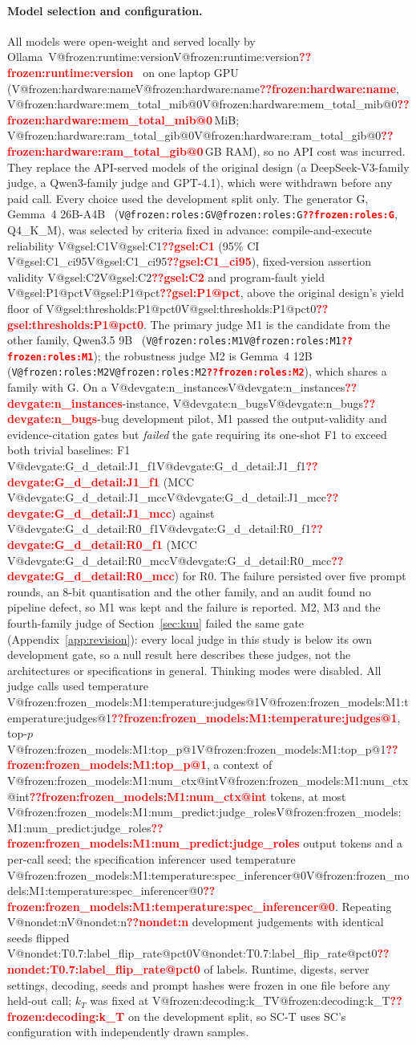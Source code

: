 \documentclass[pdflatex,iicol,sn-mathphys-num]{sn-jnl}
\makeatletter
\newcommand{\V}[1]{\ifcsname V@#1\endcsname\csname V@#1\endcsname\else\textbf{\textcolor{red}{??#1}}\fi}
\makeatother
\begin{document}
\paragraph{Model selection and configuration.} All models were open-weight and served locally by Ollama~\V{frozen:runtime:version}~\cite{ollama04013} on one laptop GPU (\V{frozen:hardware:name}, \V{frozen:hardware:mem_total_mib@0}\,MiB; \V{frozen:hardware:ram_total_gib@0}\,GB RAM), so no API cost was incurred. They replace the API-served models of the original design (a DeepSeek-V3-family judge, a Qwen3-family judge and GPT-4.1), which were withdrawn before any paid call. Every choice used the development split only. The generator G, Gemma~4 26B-A4B~\cite{gemma4} (\texttt{\V{frozen:roles:G}}, Q4\_K\_M), was selected by criteria fixed in advance: compile-and-execute reliability \V{gsel:C1} (95\% CI \V{gsel:C1_ci95}), fixed-version assertion validity \V{gsel:C2} and program-fault yield \V{gsel:P1@pct}, above the original design's yield floor of \V{gsel:thresholds:P1@pct0}. The primary judge M1 is the candidate from the other family, Qwen3.5 9B~\cite{qwen35_9b} (\texttt{\V{frozen:roles:M1}}); the robustness judge M2 is Gemma~4 12B (\texttt{\V{frozen:roles:M2}}), which shares a family with G. On a \V{devgate:n_instances}-instance, \V{devgate:n_bugs}-bug development pilot, M1 passed the output-validity and evidence-citation gates but \emph{failed} the gate requiring its one-shot F1 to exceed both trivial baselines: F1 \V{devgate:G_d_detail:J1_f1} (MCC \V{devgate:G_d_detail:J1_mcc}) against \V{devgate:G_d_detail:R0_f1} (MCC \V{devgate:G_d_detail:R0_mcc}) for R0. The failure persisted over five prompt rounds, an 8-bit quantisation and the other family, and an audit found no pipeline defect, so M1 was kept and the failure is reported. M2, M3 and the fourth-family judge of Section~\ref{sec:kuu} failed the same gate (Appendix~\ref{app:revision}): every local judge in this study is below its own development gate, so a null result here describes these judges, not the architectures or specifications in general. Thinking modes were disabled. All judge calls used temperature \V{frozen:frozen_models:M1:temperature:judges@1}, top-$p$ \V{frozen:frozen_models:M1:top_p@1}, a context of \V{frozen:frozen_models:M1:num_ctx@int} tokens, at most \V{frozen:frozen_models:M1:num_predict:judge_roles} output tokens and a per-call seed; the specification inferencer used temperature \V{frozen:frozen_models:M1:temperature:spec_inferencer@0}. Repeating \V{nondet:n} development judgements with identical seeds flipped \V{nondet:T0.7:label_flip_rate@pct0} of labels. Runtime, digests, server settings, decoding, seeds and prompt hashes were frozen in one file before any held-out call; $k_T$ was fixed at \V{frozen:decoding:k_T} on the development split, so SC-T uses SC's configuration with independently drawn samples.
\end{document}
